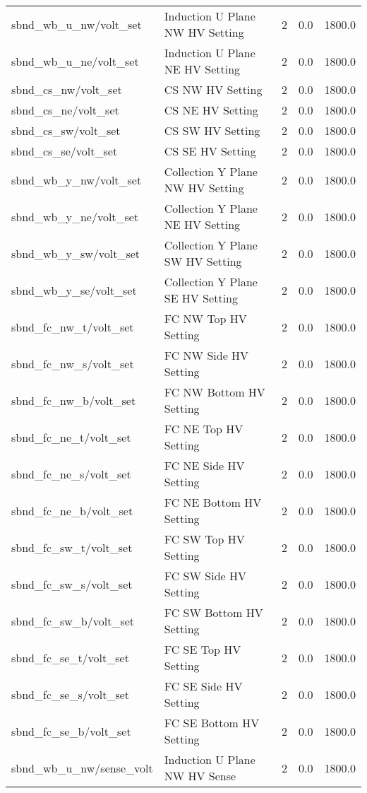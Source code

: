\begin{center}
\begin{longtable}{l | l l l l }
sbnd\_wb\_u\_nw/volt\_set & Induction U Plane NW HV Setting & 2 & 0.0 & 1800.0\\ 
sbnd\_wb\_u\_ne/volt\_set & Induction U Plane NE HV Setting & 2 & 0.0 & 1800.0\\ 
sbnd\_cs\_nw/volt\_set & CS NW HV Setting & 2 & 0.0 & 1800.0\\ 
sbnd\_cs\_ne/volt\_set & CS NE HV Setting & 2 & 0.0 & 1800.0\\ 
sbnd\_cs\_sw/volt\_set & CS SW HV Setting & 2 & 0.0 & 1800.0\\ 
sbnd\_cs\_se/volt\_set & CS SE HV Setting & 2 & 0.0 & 1800.0\\ 
sbnd\_wb\_y\_nw/volt\_set & Collection Y Plane NW HV Setting & 2 & 0.0 & 1800.0\\ 
sbnd\_wb\_y\_ne/volt\_set & Collection Y Plane NE HV Setting & 2 & 0.0 & 1800.0\\ 
sbnd\_wb\_y\_sw/volt\_set & Collection Y Plane SW HV Setting & 2 & 0.0 & 1800.0\\ 
sbnd\_wb\_y\_se/volt\_set & Collection Y Plane SE HV Setting & 2 & 0.0 & 1800.0\\ 
sbnd\_fc\_nw\_t/volt\_set & FC NW Top HV Setting & 2 & 0.0 & 1800.0\\ 
sbnd\_fc\_nw\_s/volt\_set & FC NW Side HV Setting & 2 & 0.0 & 1800.0\\ 
sbnd\_fc\_nw\_b/volt\_set & FC NW Bottom HV Setting & 2 & 0.0 & 1800.0\\ 
sbnd\_fc\_ne\_t/volt\_set & FC NE Top HV Setting & 2 & 0.0 & 1800.0\\ 
sbnd\_fc\_ne\_s/volt\_set & FC NE Side HV Setting & 2 & 0.0 & 1800.0\\ 
sbnd\_fc\_ne\_b/volt\_set & FC NE Bottom HV Setting & 2 & 0.0 & 1800.0\\ 
sbnd\_fc\_sw\_t/volt\_set & FC SW Top HV Setting & 2 & 0.0 & 1800.0\\ 
sbnd\_fc\_sw\_s/volt\_set & FC SW Side HV Setting & 2 & 0.0 & 1800.0\\ 
sbnd\_fc\_sw\_b/volt\_set & FC SW Bottom HV Setting & 2 & 0.0 & 1800.0\\ 
sbnd\_fc\_se\_t/volt\_set & FC SE Top HV Setting & 2 & 0.0 & 1800.0\\ 
sbnd\_fc\_se\_s/volt\_set & FC SE Side HV Setting & 2 & 0.0 & 1800.0\\ 
sbnd\_fc\_se\_b/volt\_set & FC SE Bottom HV Setting & 2 & 0.0 & 1800.0\\ 
sbnd\_wb\_u\_nw/sense\_volt & Induction U Plane NW HV Sense & 2 & 0.0 & 1800.0\\ 

\end{longtable}
\end{center}
